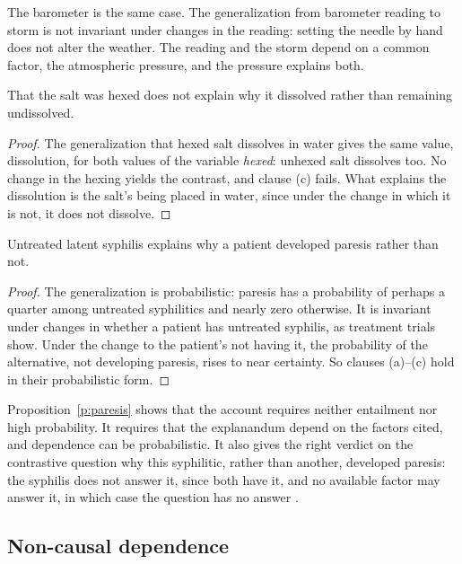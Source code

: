 \documentclass{situationist-preprint}
\begin{document}
The barometer is the same case. The generalization from barometer reading to storm is not invariant under changes in the reading: setting the needle by hand does not alter the weather. The reading and the storm depend on a common factor, the atmospheric pressure, and the pressure explains both.

\begin{proposition}[Irrelevance]\label{p:hex}
That the salt was hexed does not explain why it dissolved rather than remaining undissolved.
\end{proposition}

\begin{proof}
The generalization that hexed salt dissolves in water gives the same value, dissolution, for both values of the variable \emph{hexed}: unhexed salt dissolves too. No change in the hexing yields the contrast, and clause (c) fails. What explains the dissolution is the salt's being placed in water, since under the change in which it is not, it does not dissolve.
\end{proof}

\begin{proposition}\label{p:paresis}
Untreated latent syphilis explains why a patient developed paresis rather than not.
\end{proposition}

\begin{proof}
The generalization is probabilistic: paresis has a probability of perhaps a quarter among untreated syphilitics and nearly zero otherwise. It is invariant under changes in whether a patient has untreated syphilis, as treatment trials show. Under the change to the patient's not having it, the probability of the alternative, not developing paresis, rises to near certainty. So clauses (a)--(c) hold in their probabilistic form.
\end{proof}

Proposition~\ref{p:paresis} shows that the account requires neither entailment nor high probability. It requires that the explanandum depend on the factors cited, and dependence can be probabilistic. It also gives the right verdict on the contrastive question why this syphilitic, rather than another, developed paresis: the syphilis does not answer it, since both have it, and no available factor may answer it, in which case the question has no answer \citep{Hitchcock1999}.

\subsection{Non-causal dependence}\label{s:noncausal}
\end{document}
